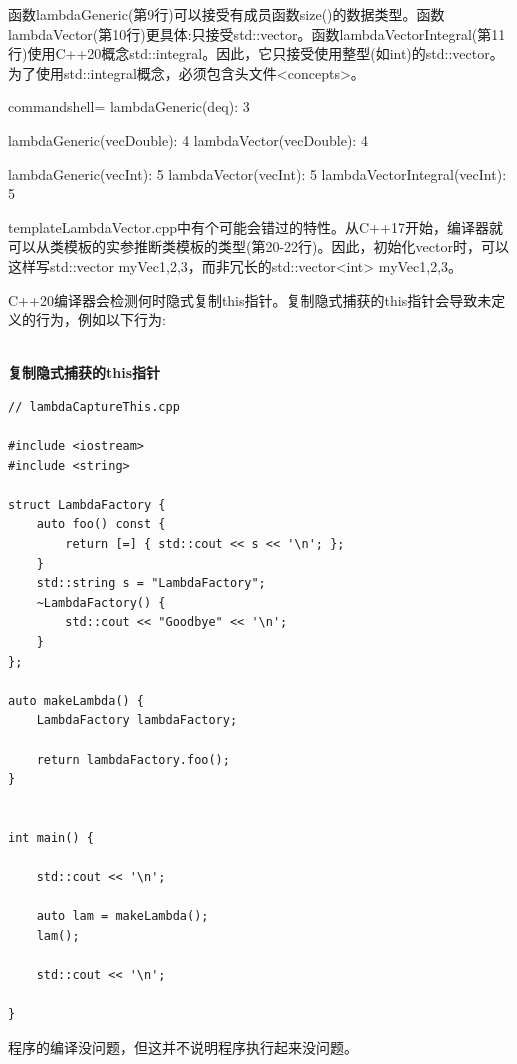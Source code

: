 函数lambdaGeneric(第9行)可以接受有成员函数size()的数据类型。函数lambdaVector(第10行)更具体:只接受std::vector。函数lambdaVectorIntegral(第11行)使用C++20概念std::integral。因此，它只接受使用整型(如int)的std::vector。为了使用std::integral概念，必须包含头文件<concepts>。

\begin{tcblisting}{commandshell={}}
lambdaGeneric(deq): 3

lambdaGeneric(vecDouble): 4
lambdaVector(vecDouble): 4

lambdaGeneric(vecInt): 5
lambdaVector(vecInt): 5
lambdaVectorIntegral(vecInt): 5
\end{tcblisting}

\begin{tcolorbox}[breakable,enhanced jigsaw,colback=mygreen!5!white,colframe=mygreen!75!black,title={类模板参数的推导}]
templateLambdaVector.cpp中有个可能会错过的特性。从C++17开始，编译器就可以从类模板的实参推断类模板的类型(第20-22行)。因此，初始化vector时，可以这样写std::vector myVec{1,2,3}，而非冗长的std::vector<int> myVec{1,2,3}。
\end{tcolorbox}


C++20编译器会检测何时隐式复制this指针。复制隐式捕获的this指针会导致未定义的行为，例如以下行为:

\hspace*{\fill} \\ %
\noindent
\textbf{复制隐式捕获的this指针}
\begin{lstlisting}[style=styleCXX]
// lambdaCaptureThis.cpp

#include <iostream>
#include <string>

struct LambdaFactory {
	auto foo() const {
		return [=] { std::cout << s << '\n'; };
	}
	std::string s = "LambdaFactory";
	~LambdaFactory() {
		std::cout << "Goodbye" << '\n';
	}
};

auto makeLambda() {
	LambdaFactory lambdaFactory; 
	
	return lambdaFactory.foo();
}


int main() {

	std::cout << '\n';
	
	auto lam = makeLambda();
	lam();
	
	std::cout << '\n';

}
\end{lstlisting}

程序的编译没问题，但这并不说明程序执行起来没问题。

